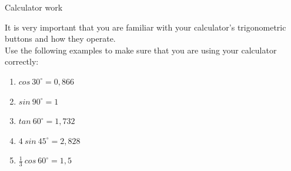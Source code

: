 \begin{activity}{Calculator work}

It is very important that you are familiar with your calculator's trigonometric buttons and how they operate. \\
Use the following examples to make sure that you are using your calculator correctly:
\begin{enumerate}[noitemsep, label=\textbf{\arabic*}. ] 
 \item $cos~ 30^{\circ} = 0,866$
\item $sin~90^{\circ} = 1$
\item $tan~60^{\circ} = 1,732$
\item $4~sin~45^{\circ}=2,828$
\item $\frac{1}{3}~cos~60^{\circ}=1,5$
\end{enumerate}

\end{activity}

